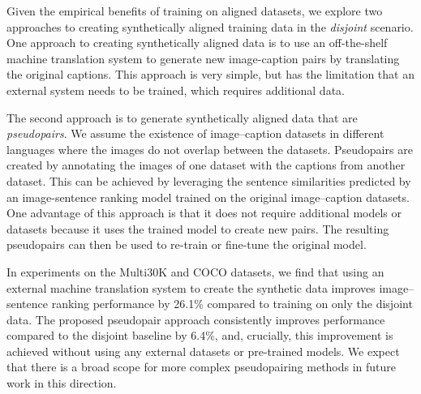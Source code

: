  
 Given the empirical benefits of training on aligned datasets, 
 we explore two approaches to creating synthetically 
 aligned training data in the \emph{disjoint} scenario. 
 One approach to creating synthetically aligned data is to use an
 off-the-shelf machine translation system to generate 
 new image-caption pairs by translating the original
 captions.
 This approach is very simple, but has the limitation 
 that an external system needs to be trained, which requires additional data. 
 
 The second approach is to generate synthetically aligned data that are \emph{pseudopairs}. We assume the existence of image--caption datasets in different languages where the images do not overlap between the datasets. Pseudopairs are created by annotating the images of one dataset with the captions from another dataset. This can be achieved by leveraging the sentence similarities predicted by an image-sentence ranking model trained on the original image--caption datasets. 
 One advantage of this approach is that it does not
 require additional models or datasets because it uses the 
 trained model to create new pairs. 
 The resulting pseudopairs can then be used 
 to re-train or fine-tune the original model. 

In experiments on the Multi30K and COCO datasets, we find that using an external machine translation system to create the synthetic data improves image--sentence ranking performance by 26.1\% compared to training on only the disjoint data. The proposed pseudopair approach consistently improves performance compared to the disjoint baseline by 6.4\%, and, crucially, this improvement is achieved without using any external datasets or pre-trained models. We expect that there is a broad scope for more complex pseudopairing methods in future work in this direction. %

